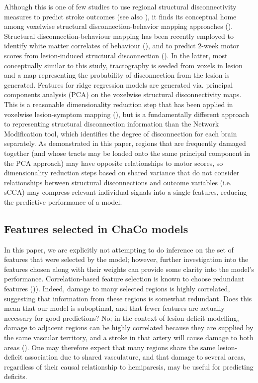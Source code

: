 \documentclass[phd,tocprelim]{cornell}
\begin{document}
Although this is one of few studies to use regional structural disconnectivity measures to predict stroke outcomes (see also \cite{Tozlu2020-qa, Kuceyeski2016-vj}), it finds its conceptual home among voxelwise structural disconnection-behavior mapping approaches (\cite{Salvalaggio2020-pe, Wawrzyniak2022-kl, Foulon2018-bj, Sperber2022-oj}). Structural disconnection-behaviour mapping has been recently employed to identify white matter correlates of behaviour (\cite{Wawrzyniak2022-kl, Foulon2018-bj}), and to predict 2-week motor scores from lesion-induced structural disconnection (\cite{Salvalaggio2020-pe}). In the latter, most conceptually similar to this study, tractography is seeded from voxels in lesion and a map representing the probability of disconnection from the lesion is generated. Features for ridge regression models are generated via. principal components analysis (PCA) on the voxelwise structural disconnectivity maps. This is a reasonable dimensionality reduction step that has been applied in voxelwise lesion-symptom mapping (\cite{Ivanova2021-nh}), but is a fundamentally different approach to representing structural disconnection information than the Network Modification tool, which identifies the degree of disconnection for each brain separately. As demonstrated in this paper, regions that are frequently damaged together (and whose tracts may be loaded onto the same principal component in the PCA approach) may have opposite relationships to motor scores, so dimensionality reduction steps based on shared variance that do not consider relationships between structural disconnections and outcome variables (i.e. sCCA) may compress relevant individual signals into a single features, reducing the predictive performance of a model. 

\subsection{Features selected in ChaCo models}

In this paper, we are explicitly not attempting to do inference on the set of features that were selected by the model; however, further investigation into the features chosen along with their weights can provide some clarity into the model's performance. Correlation-based feature selection is known to choose redundant features (\cite{Guyon2003-kj})). Indeed, damage to many selected regions is highly correlated, suggesting that information from these regions is somewhat redundant. Does this mean that our model is suboptimal, and that fewer features are actually necessary for good predictions? No; in the context of lesion-deficit modelling, damage to adjacent regions can be highly correlated because they are supplied by the same vascular territory, and a stroke in that artery will cause damage to both areas (\cite{Mah2014-cb, Sperber2020-kp}). One may therefore expect that many regions share the same lesion-deficit association due to shared vasculature, and that damage to several areas, regardless of their causal relationship to hemiparesis, may be useful for predicting deficits. 
\end{document}
